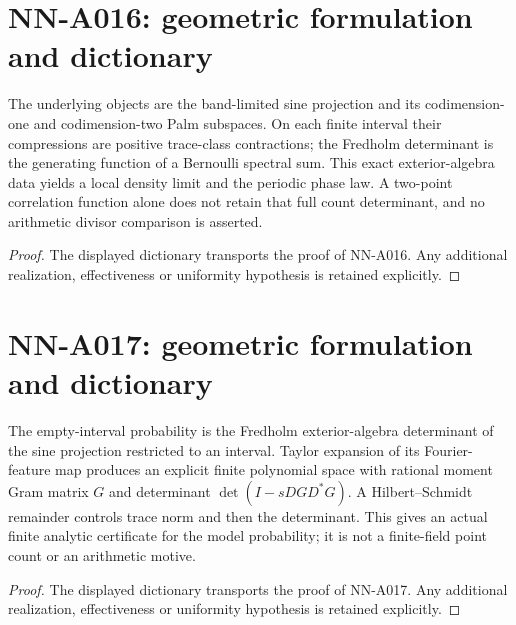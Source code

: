 \section{NN-A016: geometric formulation and dictionary}
\begin{geometricstatement}[NN-A016]
The underlying objects are the band-limited sine projection and its codimension-one and codimension-two Palm subspaces. On each finite interval their compressions are positive trace-class contractions; the Fredholm determinant is the generating function of a Bernoulli spectral sum. This exact exterior-algebra data yields a local density limit and the periodic phase law. A two-point correlation function alone does not retain that full count determinant, and no arithmetic divisor comparison is asserted.
\end{geometricstatement}
\begin{proof} The displayed dictionary transports the proof of NN-A016. Any additional realization, effectiveness or uniformity hypothesis is retained explicitly.\end{proof}


\section{NN-A017: geometric formulation and dictionary}
\begin{geometricstatement}[NN-A017]
The empty-interval probability is the Fredholm exterior-algebra determinant of the sine projection restricted to an interval. Taylor expansion of its Fourier-feature map produces an explicit finite polynomial space with rational moment Gram matrix $G$ and determinant $\det(I-sDGD^*G)$. A Hilbert--Schmidt remainder controls trace norm and then the determinant. This gives an actual finite analytic certificate for the model probability; it is not a finite-field point count or an arithmetic motive.
\end{geometricstatement}
\begin{proof} The displayed dictionary transports the proof of NN-A017. Any additional realization, effectiveness or uniformity hypothesis is retained explicitly.\end{proof}


